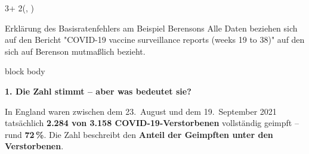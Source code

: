\documentclass{beamer}
\newlength{\blockOne}
\newlength{\blockTwo}
\begin{document}
\begin{frame}[t]




\begin{textblock*}{3\colwidth + 2\colsep}(\leftmargin, \blockTwo)

\begin{alertblock}{%
	\begin{minipage}[b]{60pt}
		\RaggedRight
		\noindent\hspace{-10pt}
	\end{minipage}%
	\begin{minipage}[b]{3\colwidth+2\colsep-125pt}\strut%
		Erklärung des Basisratenfehlers am Beispiel Berensons \;
		{\mdseries \small Alle Daten beziehen sich auf den Bericht "COVID-19 vaccine surveillance reports (weeks 19 to 38)" \cite{PHE2021} auf den sich auf Berenson mutmaßlich bezieht.}
	\end{minipage}%
}
	\vspace{-0.25cm}
	\begin{minipage}{\textwidth}
		\begin{beamercolorbox}[
			ht = 7cm, 
			wd = \linewidth, 
			left
		]{block body}

		\textbf{\large 1. Die Zahl stimmt – aber was bedeutet sie?}

		\vspace{0.35cm}
\begin{minipage}{0.92\linewidth}
    \centering
    \large
    In England waren zwischen dem 23.~August und dem
    19.~September 2021 tatsächlich
    \textbf{2.284 von 3.158 COVID-19-Verstorbenen}
    vollständig geimpft – rund \textbf{72\,\%}.
    \cite{PHE2021} Die Zahl beschreibt den \textbf{Anteil der Geimpften
    unter den Verstorbenen}.
\end{minipage}


\end{beamercolorbox}
\end{minipage}
\end{alertblock}
\end{textblock*}
\end{frame}
\end{document}
